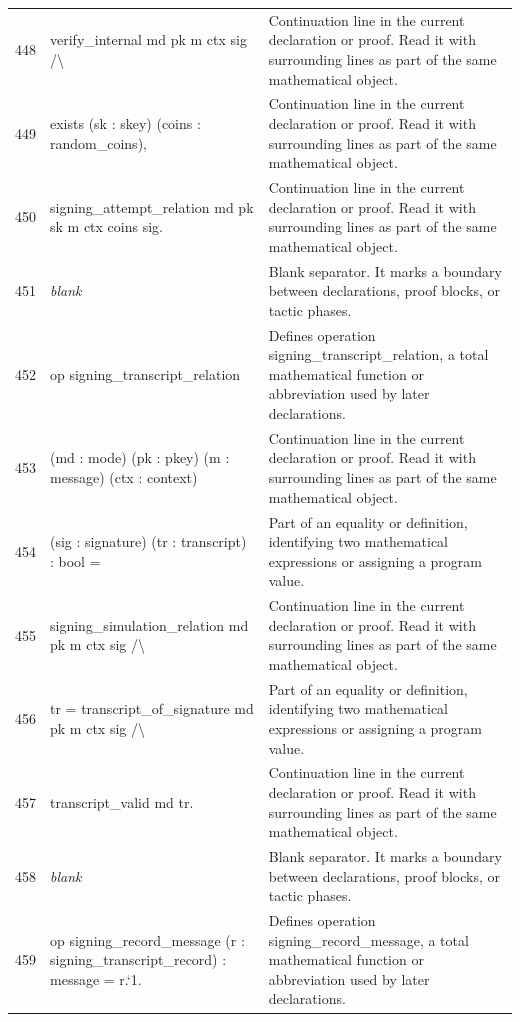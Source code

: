\documentclass[10pt]{article}
\begin{document}
\begin{longtable}{r L{0.53\textwidth} L{0.37\textwidth}}
448 & {\ttfamily\scriptsize   verify\_internal md pk m ctx sig /\textbackslash{}} & Continuation line in the current declaration or proof.  Read it with surrounding lines as part of the same mathematical object. \\
449 & {\ttfamily\scriptsize   exists (sk : skey) (coins : random\_coins),} & Continuation line in the current declaration or proof.  Read it with surrounding lines as part of the same mathematical object. \\
450 & {\ttfamily\scriptsize     signing\_attempt\_relation md pk sk m ctx coins sig.} & Continuation line in the current declaration or proof.  Read it with surrounding lines as part of the same mathematical object. \\
451 & {\ttfamily\scriptsize \emph{blank}} & Blank separator.  It marks a boundary between declarations, proof blocks, or tactic phases. \\
452 & {\ttfamily\scriptsize op signing\_transcript\_relation} & Defines operation signing\_transcript\_relation, a total mathematical function or abbreviation used by later declarations. \\
453 & {\ttfamily\scriptsize    (md : mode) (pk : pkey) (m : message) (ctx : context)} & Continuation line in the current declaration or proof.  Read it with surrounding lines as part of the same mathematical object. \\
454 & {\ttfamily\scriptsize    (sig : signature) (tr : transcript) : bool =} & Part of an equality or definition, identifying two mathematical expressions or assigning a program value. \\
455 & {\ttfamily\scriptsize   signing\_simulation\_relation md pk m ctx sig /\textbackslash{}} & Continuation line in the current declaration or proof.  Read it with surrounding lines as part of the same mathematical object. \\
456 & {\ttfamily\scriptsize   tr = transcript\_of\_signature md pk m ctx sig /\textbackslash{}} & Part of an equality or definition, identifying two mathematical expressions or assigning a program value. \\
457 & {\ttfamily\scriptsize   transcript\_valid md tr.} & Continuation line in the current declaration or proof.  Read it with surrounding lines as part of the same mathematical object. \\
458 & {\ttfamily\scriptsize \emph{blank}} & Blank separator.  It marks a boundary between declarations, proof blocks, or tactic phases. \\
459 & {\ttfamily\scriptsize op signing\_record\_message (r : signing\_transcript\_record) : message = r.`1.} & Defines operation signing\_record\_message, a total mathematical function or abbreviation used by later declarations. \\

\end{longtable}
\end{document}
